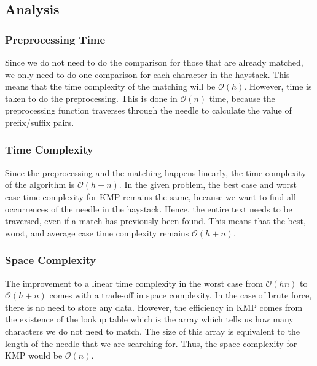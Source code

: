 \subsection*{Analysis}

\subsubsection{Preprocessing Time}
Since we do not need to do the comparison for those that are already matched, we only need to do one comparison for each character in the haystack. This means that the time complexity of the matching will be $\mathcal{O}(h)$. However, time is taken to do the preprocessing. This is done in $\mathcal{O}(n)$ time, because the preprocessing function traverses through the needle to calculate the value of prefix/suffix pairs. 

\subsubsection{Time Complexity}
Since the preprocessing and the matching happens linearly, the time complexity of the algorithm is $\mathcal{O}(h+n)$. In the given problem, the best case and worst case time complexity for KMP remains the same, because we want to find all occurrences of the needle in the haystack. Hence, the entire text needs to be traversed, even if a match has previously been found. This means that the best, worst, and average case time complexity remains $\mathcal{O}(h+n)$.

\subsubsection{Space Complexity}
The improvement to a linear time complexity in the worst case from $\mathcal{O}(hn)$ to $\mathcal{O}(h + n)$ comes with a trade-off in space complexity. In the case of brute force, there is no need to store any data. However, the efficiency in KMP comes from the existence of the lookup table which is the array which tells us how many characters we do not need to match. The size of this array is equivalent to the length of the needle that we are searching for. Thus, the space complexity for KMP would be $\mathcal{O}(n)$.

